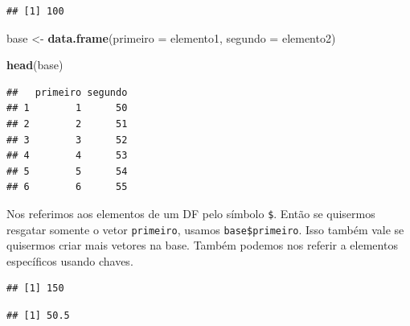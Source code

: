 \documentclass[
]{article}
\newenvironment{Shaded}{\begin{snugshade}}{\end{snugshade}}
\newcommand{\CommentTok}[1]{\textcolor[rgb]{0.56,0.35,0.01}{\textit{#1}}}
\newcommand{\DataTypeTok}[1]{\textcolor[rgb]{0.13,0.29,0.53}{#1}}
\newcommand{\KeywordTok}[1]{\textcolor[rgb]{0.13,0.29,0.53}{\textbf{#1}}}
\newcommand{\NormalTok}[1]{#1}
\newcommand{\OperatorTok}[1]{\textcolor[rgb]{0.81,0.36,0.00}{\textbf{#1}}}
\newcommand{\StringTok}[1]{\textcolor[rgb]{0.31,0.60,0.02}{#1}}
\begin{document}
\begin{verbatim}
## [1] 100
\end{verbatim}

\begin{Shaded}
\begin{Highlighting}[]
\NormalTok{base <-}\StringTok{ }\KeywordTok{data.frame}\NormalTok{(}\DataTypeTok{primeiro =}\NormalTok{ elemento1,}
                  \DataTypeTok{segundo =}\NormalTok{ elemento2)}

\KeywordTok{head}\NormalTok{(base)}
\end{Highlighting}
\end{Shaded}

\begin{verbatim}
##   primeiro segundo
## 1        1      50
## 2        2      51
## 3        3      52
## 4        4      53
## 5        5      54
## 6        6      55
\end{verbatim}

Nos referimos aos elementos de um DF pelo símbolo \texttt{\$}. Então se
quisermos resgatar somente o vetor \texttt{primeiro}, usamos
\texttt{base\$primeiro}. Isso também vale se quisermos criar mais
vetores na base. Também podemos nos referir a elementos específicos
usando chaves.

\begin{Shaded}
\end{Shaded}

\begin{verbatim}
## [1] 150
\end{verbatim}

\begin{Shaded}
\end{Shaded}

\begin{verbatim}
## [1] 50.5
\end{verbatim}
\end{document}
